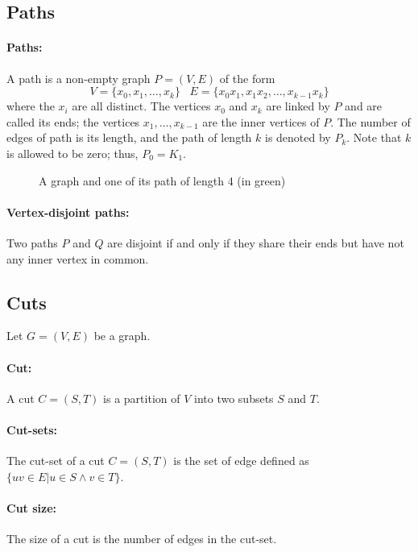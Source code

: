 \subsection{Paths}
\paragraph{Paths:}
A path is a non-empty graph $P = (V, E)$ of the form
$$ V = \{x_0,x_1, \dots, x_k \} \;\;\; E=\{x_0x_1, x_1x_2, \dots, x_{k-1}x_k \}$$
where the $x_i$ are all distinct. The vertices $x_0$ and $x_k$ are linked
by $P$ and are called its ends; the vertices $x_1, \dots, x_{k-1}$ are the
inner vertices of $P$. The number of edges of path is its
length, and the path of length $k$ is denoted by $P_k$. Note that $k$ is
allowed to be zero; thus, $P_0 = K_1$.

\begin{figure}[!h]
  \caption{A graph and one of its path of length 4 (in green)}
  \begin{center}
    
  \end{center}
\end{figure}

\paragraph{Vertex-disjoint paths:}
Two paths $P$ and $Q$ are disjoint if and only if they share their ends but
have not any inner vertex in common.

\subsection{Cuts}
Let $G=(V,E)$ be a graph.
\paragraph{Cut:}
A cut $C=(S,T)$ is a partition of $V$ into two subsets $S$ and $T$.

\paragraph{Cut-sets:}
The cut-set of a cut $C=(S,T)$ is the set of edge defined as $\{uv \in E | u \in S \wedge v \in T\}$.

\paragraph{Cut size:}
The size of a cut is the number of edges in the cut-set.

